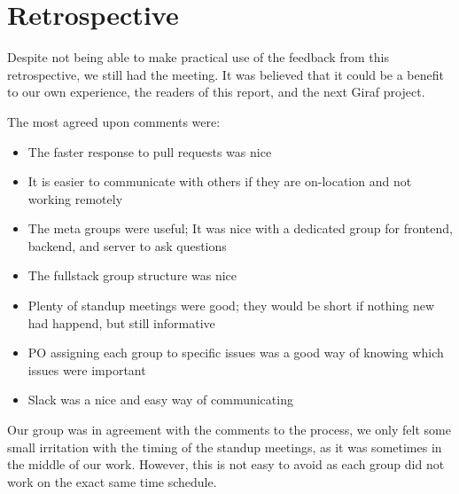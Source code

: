 \section{Retrospective}
Despite not being able to make practical use of the feedback from this retrospective, we still had the meeting. 
It was believed that it could be a benefit to our own experience, the readers of this report, and the next Giraf project.

The most agreed upon comments were:
\begin{itemize}
  \item The faster response to pull requests was nice
  \item It is easier to communicate with others if they are on-location and not working remotely
  \item The meta groups were useful; It was nice with a dedicated group for frontend, backend, and server to ask questions
  \item The fullstack group structure was nice
  \item Plenty of standup meetings were good; they would be short if nothing new had happend, but still informative
  \item PO assigning each group to specific issues was a good way of knowing which issues were important
  \item Slack was a nice and easy way of communicating
\end{itemize}

Our group was in agreement with the comments to the process, we only felt some small irritation with the timing of the standup meetings, as it was sometimes in the middle of our work. 
However, this is not easy to avoid as each group did not work on the exact same time schedule.

